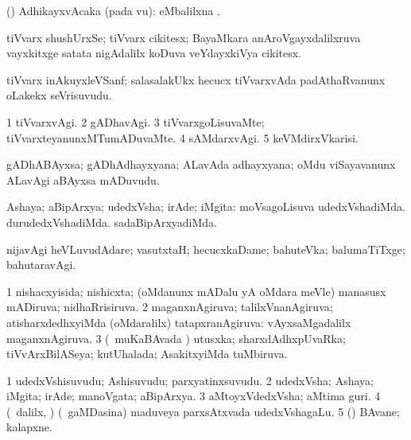 \bentry
{}
\gl{\nA}
\bmng
(\vAyx) AdhikayxvAcaka (pada \mo vu):  eMbalilxna . 
\emng
\eentry

\bentry
{}
\gl{\nA}
\bmng
tiVvarx shushUrxSe; tiVvarx cikitesx; BayaMkara anAroVgayxdalilxruva vayxkitxge satata nigAdalilx koDuva veYdayxkiVya cikitesx. 
\emng
\eentry

\bentry
{}
\gl{\nA}
\bmng
tiVvarx inAkuyxleVSanf; salasalakUkx hecucx tiVvarxvAda padAthaRvanunx oLakekx seVrisuvudu. 
\emng
\eentry

\bentry
{}
\gl{\kirxvi}
\bmng
\bnum
\num{1} tiVvarxvAgi. 
\num{2} gADhavAgi. 
\num{3} tiVvarxgoLisuvaMte; tiVvarxteyanunxMTumADuvaMte. 
\num{4} sAMdarxvAgi. 
\num{5} keVMdirxVkarisi. 
\enum
\emng
\eentry

\bentry
{}
\gl{\nA}
\bmng
gADhABAyxsa; gADhAdhayxyana; ALavAda adhayxyana; oMdu viSayavanunx ALavAgi aBAyxsa mADuvudu. 
\emng
\eentry

\bentry
{}
\gl{\nA}
\bmng
Ashaya; aBipArxya; udedxVsha; irAde; iMgita:  moVsagoLisuva udedxVshadiMda.  durudedxVshadiMda.  sadaBipArxyadiMda. 
\emng

\noindent 
\gl{\nuga}
\bmng
{} nijavAgi heVLuvudAdare; vasutxtaH; hecucxkaDame; bahuteVka; balumaTiTxge; bahutaravAgi. 
\emng
\eentry

\bentry
{}
\gl{\gu}
\bmng
\bnum
\num{1} nishacxyisida; nishicxta; (oMdanunx mADalu yA oMdara meVle) manasusx mADiruva; nidhaRrisiruva. 
\num{2} maganxnAgiruva; talilxVnanAgiruva; atisharxdedhxyiMda (oMdaralilx) tatapxranAgiruva:  vAyxsaMgadalilx maganxnAgiruva. 
\num{3} (\kanmu\ muKaBAvada \vi) utusxka; sharxdAdhxpUvaRka; tiVvArxBilASeya; kutUhalada; AsakitxyiMda tuMbiruva. 
\enum
\emng
\eentry


\bentry
{}
\gl{\nA}
\bmng
\bnum
\num{1} udedxVshisuvudu; Ashisuvudu; parxyatinxsuvudu. 
\num{2} udedxVsha; Ashaya; iMgita; irAde; manoVgata; aBipArxya. 
\num{3} aMtoyxVdedxVsha; aMtima guri. 
\num{4} (\sA\ \bava dalilx, \AmA) (\kanmu\ gaMDasina) maduveya parxsAtxvada udedxVshagaLu. 
\num{5} (\takaR) BAvane; kalapxne. 
\enum
\emng

